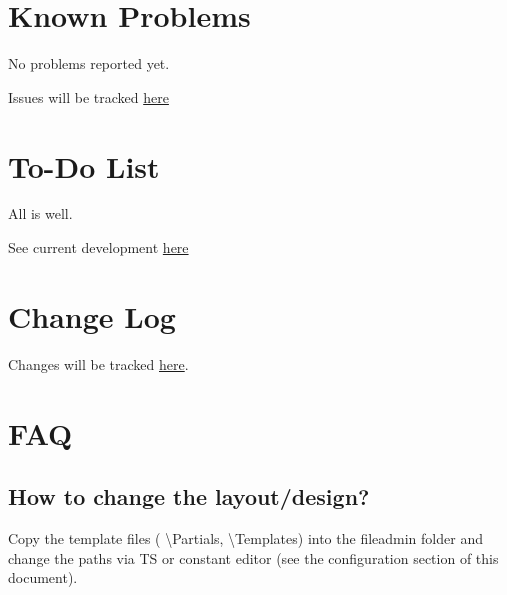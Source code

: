 \documentclass[a4paper,10pt,english]{sphinxmanual}
\begin{document}
\chapter{Known Problems}
\label{KnownProblems/Index:known-problems}\label{KnownProblems/Index::doc}\label{KnownProblems/Index:id1}
No problems reported yet.

Issues will be tracked \href{https://github.com/theorak/DatecBlog}{here}


\chapter{To-Do List}
\label{ToDoList/Index:to-do-list}\label{ToDoList/Index::doc}\label{ToDoList/Index:id1}
All is well.

See current development \href{https://github.com/theorak/DatecBlog}{here}


\chapter{Change Log}
\label{ChangeLog/Index:change-log}\label{ChangeLog/Index::doc}\label{ChangeLog/Index:id1}
Changes will be tracked \href{https://github.com/theorak/DatecBlog}{here}.


\chapter{FAQ}
\label{FAQ/Index::doc}\label{FAQ/Index:faq}\label{FAQ/Index:id1}

\section{How to change the layout/design?}
\label{FAQ/Index:how-to-change-the-layout-design}
Copy the template files ( \textbackslash{}Partials, \textbackslash{}Templates)
into the fileadmin folder and change the paths via TS or constant editor (see the configuration section of this document).



\renewcommand{\indexname}{Index}
\printindex
\end{document}
